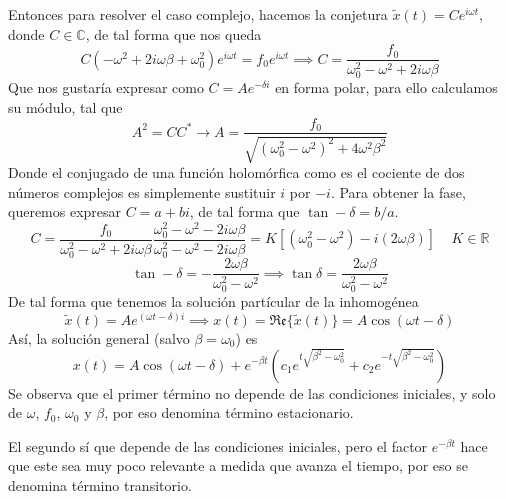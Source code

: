 Entonces para resolver el caso complejo, hacemos la conjetura $\tilde{x}(t) = C e^{i\omega t}$, donde $C \in \mathbb{C}$, de tal forma que nos queda
\begin{equation} \label{6.1.1}
    C(-\omega^2 + 2 i \omega\beta + \omega_0^2 ) e^{i\omega t} = f_0 e^{i\omega t} \implies C = \frac{f_0}{\omega_0^2 -\omega^2 + 2 i \omega\beta}
\end{equation}
Que nos gustaría expresar como $C = A e^{-\delta i}$ en forma polar, para ello calculamos su módulo, tal que
\begin{equation} \label{6.1.1}
    A^2 = C C^* \rightarrow A = \frac{f_0}{\sqrt{\left(\omega_0^2 -\omega^2\right)^2+4\omega^2 \beta^2}}
\end{equation}
Donde el conjugado de una función holomórfica como es el cociente de dos números complejos es simplemente sustituir $i$ por $-i$. Para obtener la fase, queremos expresar $C = a+bi$, de tal forma que $\tan -\delta = b/a$.
\[
    C = \frac{f_0}{\omega_0^2 -\omega^2 + 2 i \omega\beta} \frac{\omega_0^2 -\omega^2 - 2 i \omega\beta}{\omega_0^2 -\omega^2 - 2 i \omega\beta} = K \left[(\omega_0^2 -\omega^2) - i (2\omega\beta)\right] \ \ \ \ \ K \in \mathbb{R}
\]
\begin{equation} \label{6.1.1}
    \tan -\delta = -\frac{2\omega \beta}{\omega_0^2 - \omega^2} \implies \tan \delta = \frac{2\omega \beta}{\omega_0^2 - \omega^2}
\end{equation}
De tal forma que tenemos la solución partícular de la inhomogénea
\begin{equation} \label{6.1.1}
    \tilde{x}(t) = A e^{(\omega t -\delta)i} \implies x(t) = \mathfrak{Re}\{\tilde{x}(t)\}= A \cos(\omega t -\delta)
\end{equation}
Así, la solución general (salvo $\beta=\omega_0$) es 
\begin{equation} \label{6.1.1}
    x(t) = A \cos(\omega t -\delta) + e^{-\beta t} \left(c_1 e^{t\sqrt{\beta^2-\omega_0^2}}+ c_2 e^{-t\sqrt{\beta^2-\omega_0^2}}\right)
\end{equation}
Se observa que el primer término no depende de las condiciones iniciales, y solo de $\omega$, $f_0$, $\omega_0$ y $\beta$, por eso denomina término estacionario.

El segundo sí que depende de las condiciones iniciales, pero el factor $e^{-\beta t}$ hace que este sea muy poco relevante a medida que avanza el tiempo, por eso se denomina término transitorio.
